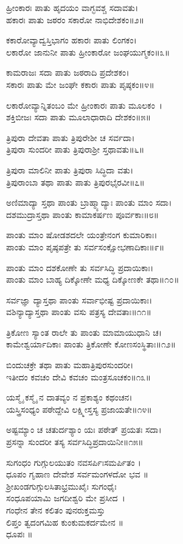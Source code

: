 ಹ್ರೀಂಕಾರಃ ಪಾತು ಹೃದಯಂ ವಾಗ್ಭವಶ್ಚ ಸದಾವತು।\\
ಹಕಾರಃ ಪಾತು ಜಠರಂ ಸಕಾರೋ ನಾಭಿದೇಶಕಂ॥೨॥

ಕಕಾರೋವ್ಯಾದ್ವಸ್ತಿಭಾಗಂ ಹಕಾರಃ ಪಾತು ಲಿಂಗಕಂ।\\
ಲಕಾರೋ ಜಾನುನೀ ಪಾತು ಹ್ರೀಂಕಾರೋ ಜಂಘಯುಗ್ಮಕಂ॥೩॥

ಕಾಮರಾಜಃ ಸದಾ ಪಾತು ಜಠರಾದಿ ಪ್ರದೇಶಕಂ।\\
ಸಕಾರಃ ಪಾತು ಮೇ ಜಂಘೇ ಕಕಾರಃ ಪಾತು ಪೃಷ್ಠಕಂ॥೪॥

ಲಕಾರೋವ್ಯಾನ್ನಿತಂಬಂ ಮೇ ಹ್ರೀಂಕಾರಃ ಪಾತು ಮೂಲಕಂ~।\\
ಶಕ್ತಿಬೀಜಃ ಸದಾ ಪಾತು ಮೂಲಾಧಾರಾದಿ ದೇಶಕಂ॥೫॥

ತ್ರಿಪುರಾ ದೇವತಾ ಪಾತು ತ್ರಿಪುರೇಶೀ ಚ ಸರ್ವದಾ।\\
ತ್ರಿಪುರಾ ಸುಂದರೀ ಪಾತು ತ್ರಿಪುರಾಶ್ರೀ ಸ್ತಥಾವತು॥೬॥

ತ್ರಿಪುರಾ ಮಾಲಿನೀ ಪಾತು ತ್ರಿಪುರಾ ಸಿದ್ಧಿದಾ ವತು।\\
ತ್ರಿಪುರಾಂಬಾ ತಥಾ ಪಾತು ಪಾತು ತ್ರಿಪುರಭೈರವೀ॥೭॥

ಅಣಿಮಾದ್ಯಾ ಸ್ತಥಾ ಪಾಂತು ಬ್ರಾಹ್ಮ್ಯಾದ್ಯಾಃ ಪಾಂತು ಮಾಂ ಸದಾ।\\
ದಶಮುದ್ರಾಸ್ತಥಾ ಪಾಂತು ಕಾಮಾಕರ್ಷಣ ಪೂರ್ವಕಾಃ॥೮॥

ಪಾಂತು ಮಾಂ ಷೋಡಶದಲೇ ಯಂತ್ರೇನಂಗ ಕುಮಾರಿಕಾಃ।\\
ಪಾಂತು ಮಾಂ ಪೃಷ್ಠಪತ್ರೇ ತು ಸರ್ವಸಂಕ್ಷೋಭಣಾದಿಕಾಃ॥೯॥

ಪಾಂತು ಮಾಂ ದಶಕೋಣೇ ತು ಸರ್ವಸಿದ್ಧಿ ಪ್ರದಾಯಿಕಾಃ।\\
ಪಾಂತು ಮಾಂ ಬಾಹ್ಯ ದಿಕ್ಕೋಣೇ ಮಧ್ಯ ದಿಕ್ಕೋಣಕೇ ತಥಾ॥೧೦॥

ಸರ್ವಜ್ಞಾ ದ್ಯಾಸ್ತಥಾ ಪಾಂತು ಸರ್ವಾಭೀಷ್ಟ ಪ್ರದಾಯಿಕಾಃ।\\
ವಶಿನ್ಯಾದ್ಯಾಸ್ತಥಾ ಪಾಂತು ವಸು ಪತ್ರಸ್ಯ ದೇವತಾಃ॥೧೧॥

ತ್ರಿಕೋಣ ಸ್ಯಾಂತ ರಾಲೇ ತು ಪಾಂತು ಮಾಮಾಯುಧಾನಿ ಚ।\\
ಕಾಮೇಶ್ವರ್ಯಾದಿಕಾಃ ಪಾಂತು ತ್ರಿಕೋಣೇ ಕೋಣಸಂಸ್ಥಿತಾಃ॥೧೨॥

ಬಿಂದುಚಕ್ರೇ ತಥಾ ಪಾತು ಮಹಾತ್ರಿಪುರಸುಂದರೀ।\\
ಇತೀದಂ ಕವಚಂ ದೇವಿ ಕವಚಂ ಮಂತ್ರಸೂಚಕಂ॥೧೩॥

ಯಸ್ಮೈ ಕಸ್ಮೈ ನ ದಾತವ್ಯಂ ನ ಪ್ರಕಾಶ್ಯಂ ಕಥಂಚನ।\\
ಯಸ್ತ್ರಿಸಂಧ್ಯಂ ಪಠೇದ್ದೇವಿ ಲಕ್ಷ್ಮೀಸ್ತಸ್ಯ ಪ್ರಜಾಯತೇ॥೧೪॥

ಅಷ್ಟಮ್ಯಾಂ ಚ ಚತುರ್ದಶ್ಯಾಂ ಯಃ ಪಠೇತ್ ಪ್ರಯತಃ ಸದಾ।\\
ಪ್ರಸನ್ನಾ ಸುಂದರೀ ತಸ್ಯ ಸರ್ವಸಿದ್ಧಿಪ್ರದಾಯಿನೀ॥೧೫॥

ಸುಗಂಧಂ ಗುಗ್ಗುಲಯುತಂ ನವಸರ್ಪಿಃಸಮರ್ಪಿತಂ ।\\
ಧೂಪಂ ಗೃಹಾಣ ದೇವೇಶ ಸರ್ವಮಂಗಳದೋ ಭವ ॥\\
ಶ್ರೀಖಂಡಗುಗ್ಗುಲಸಿತಾಭ್ರಮುಖೈಃ ಸುಗಂಧೈಃ \\ಸಂಧೂಪಯಾಮಿ ಜಗದೀಶ್ವರಿ ಮೇ ಪ್ರಸೀದ~।\\
ಗಂಧೇನ ತೇನ ಕಲಿತಂ ಪುನರುಕ್ತಮಸ್ತು\\ ಲಿಪ್ತಂ ತ್ವದಂಗಮಿಹ ಕುಂಕುಮಕರ್ದಮೇನ ॥\\
 ಧೂಪಃ ॥


